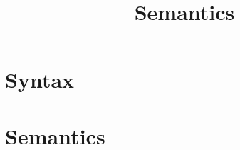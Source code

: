\documentclass[oneside,a4paper]{article}
\title{\bf Semantics}
\author{}
\date{}
\numberwithin{equation}{section}
\begin{document}
\maketitle

\section{Syntax}
\begin{small}
\begin{spacing}{0.4}
\gram{
  \otte\ottinterrule
  \otta\ottinterrule
  \ottv\ottinterrule
}
\end{spacing}
\end{small}

\section{Semantics}
\begin{spacing}{0.4}
\begin{small}
\noindent
\ottdefntvalues{}\ottinterrule
\ottdefnreduction{}\ottinterrule
\ottdefnareduction{}\ottinterrule
\end{small}
\end{spacing}

\end{document}
